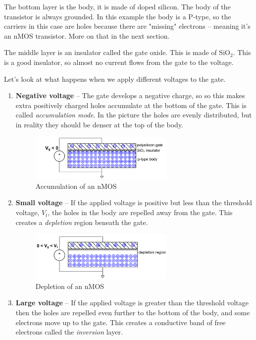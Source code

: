 \documentclass{article}
\begin{document}
The bottom layer is the body, it is made of doped silicon. The body of the transistor is always grounded. In this example the body is a P-type, so the carriers in this case are holes because there are "missing" electrons -- meaning it's an nMOS transistor. More on that in the next section.

The middle layer is an insulator called the gate oxide. This is made of $\mathrm{SiO_2}$. This is a good insulator, so almost no current flows from the gate to the voltage.

Let's look at what happens when we apply different voltages to the gate.

\begin{enumerate}
\item \textbf{Negative voltage} -- The gate develops a negative charge, so so this makes extra positively charged holes accumulate at the bottom of the gate. This is called \textit{accumulation mode}. In the picture the holes are evenly distributed, but in reality they should be denser at the top of the body.

\begin{figure}[ht!]
\centering
\includegraphics[width=70mm]{mos.png}
\caption{Accumulation of an nMOS}
\end{figure}

\item \textbf{Small voltage} -- If the applied voltage is positive but less than the threshold voltage, $V_t$, the holes in the body are repelled away from the gate. This creates a \textit{depletion} region beneath the gate.

\begin{figure}[ht!]
\centering
\includegraphics[width=70mm]{mos2.png}
\caption{Depletion of an nMOS}
\end{figure}


\item \textbf{Large voltage} -- If the applied voltage is greater than the threshold voltage then the holes are repelled even further to the bottom of the body, and some electrons move up to the gate. This creates a conductive band of free electrons called the \textit{inversion} layer.


\end{enumerate}
\end{document}
